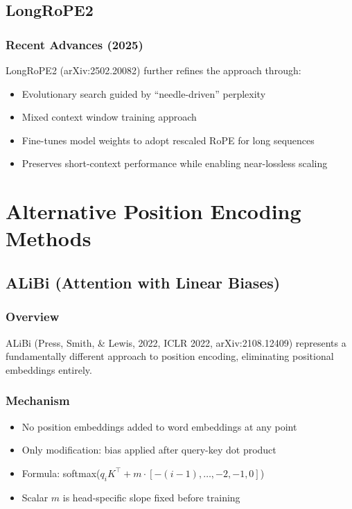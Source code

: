 \documentclass[11pt,letterpaper]{article}
\begin{document}
\subsection{LongRoPE2}

\subsubsection{Recent Advances (2025)}
LongRoPE2 (arXiv:2502.20082) further refines the approach through:
\begin{itemize}[leftmargin=*]
    \item Evolutionary search guided by ``needle-driven'' perplexity
    \item Mixed context window training approach
    \item Fine-tunes model weights to adopt rescaled RoPE for long sequences
    \item Preserves short-context performance while enabling near-lossless scaling
\end{itemize}

\section{Alternative Position Encoding Methods}

\subsection{ALiBi (Attention with Linear Biases)}

\subsubsection{Overview}
ALiBi (Press, Smith, \& Lewis, 2022, ICLR 2022, arXiv:2108.12409) represents a fundamentally different approach to position encoding, eliminating positional embeddings entirely.

\subsubsection{Mechanism}
\begin{itemize}[leftmargin=*]
    \item No position embeddings added to word embeddings at any point
    \item Only modification: bias applied after query-key dot product
    \item Formula: softmax($q_i K^\top + m \cdot [-(i-1), \ldots, -2, -1, 0]$)
    \item Scalar $m$ is head-specific slope fixed before training
\end{itemize}
\end{document}
